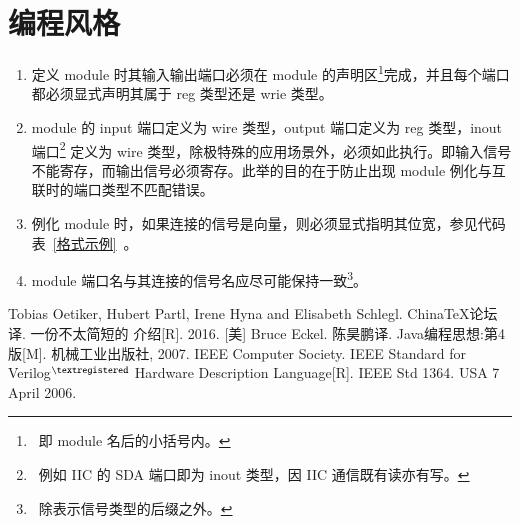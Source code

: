 \documentclass[utf-8, 10pt, a4paper, titlepage, oneside, onecolumn, openany]{ctexart} %
\begin{document}
	\section{编程风格}
		\begin{enumerate}
			\item 定义 module 时其输入输出端口必须在 module 的声明区\footnote{~即 module 名后的小括号内。}完成，并且每个端口都必须显式声明其属于 reg 类型还是 wrie 类型。
			
			\item module 的 input 端口定义为 wire 类型，output 端口定义为 reg 类型，inout 端口\footnote{~例如 IIC 的 SDA 端口即为 inout 类型，因 IIC 通信既有读亦有写。} 定义为 wire 类型，除极特殊的应用场景外，必须如此执行。即输入信号不能寄存，而输出信号必须寄存。此举的目的在于防止出现 module 例化与互联时的端口类型不匹配错误。
			
			\item 例化 module 时，如果连接的信号是向量，则必须显式指明其位宽，参见代码表~\ref{格式示例}~。
			
			\item module 端口名与其连接的信号名应尽可能保持一致\footnote{~除表示信号类型的后缀之外。}。
			
		\end{enumerate}

	\clearpage

	\begin{thebibliography}{9}
		 Tobias Oetiker, Hubert Partl, Irene Hyna and Elisabeth Schlegl. China\TeX 论坛译. 一份不太简短的 \LaTeXe 介绍[R]. 2016.
		 [美] Bruce Eckel. 陈昊鹏译. Java编程思想:第4版[M]. 机械工业出版社, 2007.
		 IEEE Computer Society. IEEE Standard for Verilog$^{\textregistered}$ Hardware Description Language[R]. IEEE Std 1364. USA 7 April 2006.
	\end{thebibliography}

	\clearpage

	\listoftables %

\end{document}
